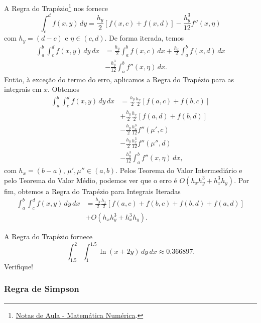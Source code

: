 A Regra do Trapézio\footnote{\href{https://phkonzen.github.io/notas/MatematicaNumerica/cap_integr_sec_NC.html}{Notas de Aula - Matemática Numérica}.} nos fornece
\begin{equation}
  \int_c^d f(x,y)\,dy = \frac{h_y}{2}\left[f(x,c) + f(x,d)\right] - \frac{h_y^3}{12}f''(x,\eta)
\end{equation}
com $h_y = (d-c)$ e $\eta\in (c,d)$. De forma iterada, temos
\begin{align}
  \int_a^b\int_c^d f(x,y)\,dy\,dx &= \frac{h_y}{2}\int_a^b f(x,c)\,dx + \frac{h_x}{2}\int_a^bf(x,d)\,dx\\
                                  &- \frac{h_y^3}{12}\int_a^b f''(x,\eta)\,dx.
\end{align}
Então, à exceção do termo do erro, aplicamos a Regra do Trapézio para as integrais em $x$. Obtemos
\begin{align}
  \int_a^b\int_c^d f(x,y)\,dy\,dx &= \frac{h_y}{2}\frac{h_x}{2}\left[f(a,c) + f(b,c)\right]\\
                                  &+ \frac{h_y}{2}\frac{h_x}{2}\left[f(a,d) + f(b,d)\right]\\
                                  &-\frac{h_y}{2}\frac{h_x^3}{12}f''(\mu',c)\\
                                  &-\frac{h_y}{2}\frac{h_x^3}{12}f''(\mu'',d)\\
                                  &-\frac{h_y^3}{12}\int_a^b f''(x,\eta)\,dx,
\end{align}
com $h_x = (b-a)$, $\mu',\mu''\in (a,b)$. Pelos Teorema do Valor Intermediário e pelo Teorema do Valor Médio, podemos ver que o erro é $O(h_xh_y^3 + h_x^3h_y)$. Por fim, obtemos a Regra do Trapézio para Integrais Iteradas
\begin{align}
  \int_a^b\int_c^d f(x,y)\,dy\,dx &= \frac{h_y}{2}\frac{h_x}{2}\left[f(a,c)+f(b,c)+f(b,d)+f(a,d)\right]\\
                                  &+ O(h_xh_y^3 + h_x^3h_y).
\end{align}

\begin{ex}
  A Regra do Trapézio fornece
  \begin{equation}
    \int_{1.5}^{2}\int_{1}^{1.5}\ln(x + 2y)\,dy\,dx \approx 0.366897.
  \end{equation}
  Verifique!
\end{ex}

\subsubsection{Regra de Simpson}

